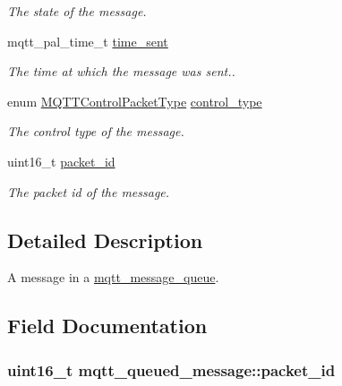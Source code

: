 \begin{DoxyCompactItemize}
\begin{DoxyCompactList}\small\item\em The state of the message. \end{DoxyCompactList}\item 
mqtt\+\_\+pal\+\_\+time\+\_\+t \hyperlink{structmqtt__queued__message_a3bf569b81ee8d77d9986fa35ce22ab3f}{time\+\_\+sent}
\begin{DoxyCompactList}\small\item\em The time at which the message was sent.. \end{DoxyCompactList}\item 
enum \hyperlink{group__unpackers_gacbd36b88ec7f62bc161b07e1a0aed679}{M\+Q\+T\+T\+Control\+Packet\+Type} \hyperlink{structmqtt__queued__message_a66ebb83c15a27831577862461723da3f}{control\+\_\+type}\hypertarget{structmqtt__queued__message_a66ebb83c15a27831577862461723da3f}{}\label{structmqtt__queued__message_a66ebb83c15a27831577862461723da3f}

\begin{DoxyCompactList}\small\item\em The control type of the message. \end{DoxyCompactList}\item 
uint16\+\_\+t \hyperlink{structmqtt__queued__message_ac20454e900b6d29e4d25edcdad57a99b}{packet\+\_\+id}
\begin{DoxyCompactList}\small\item\em The packet id of the message. \end{DoxyCompactList}\end{DoxyCompactItemize}


\subsection{Detailed Description}
A message in a \hyperlink{structmqtt__message__queue}{mqtt\+\_\+message\+\_\+queue}. 

\subsection{Field Documentation}
\subsubsection[{\texorpdfstring{packet\+\_\+id}{packet_id}}]{\setlength{\rightskip}{0pt plus 5cm}uint16\+\_\+t mqtt\+\_\+queued\+\_\+message\+::packet\+\_\+id}\hypertarget{structmqtt__queued__message_ac20454e900b6d29e4d25edcdad57a99b}{}\label{structmqtt__queued__message_ac20454e900b6d29e4d25edcdad57a99b}


